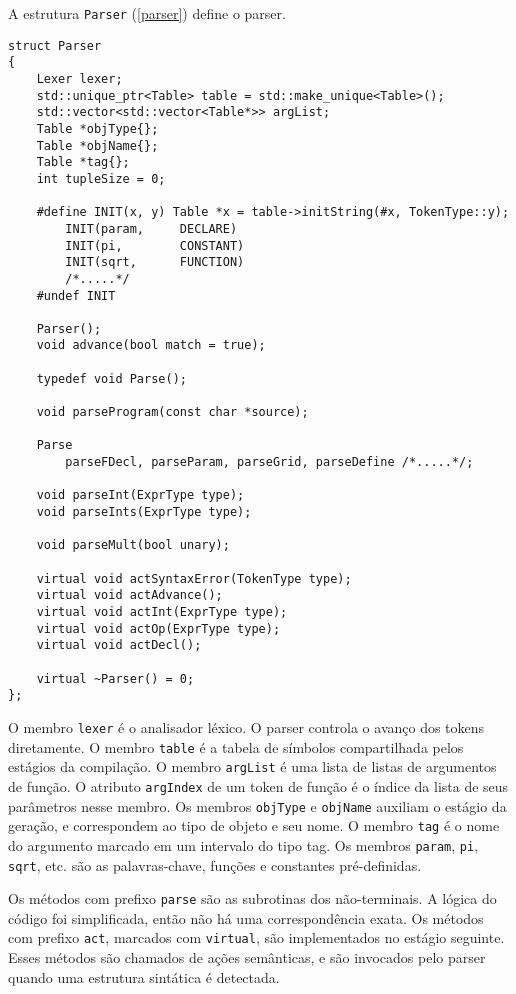 A estrutura \texttt{Parser} (\ref{parser}) define o parser.

\begin{lstlisting}[caption=Estrutura parcial do parser, label=parser]
struct Parser
{
    Lexer lexer;
    std::unique_ptr<Table> table = std::make_unique<Table>();
    std::vector<std::vector<Table*>> argList;
    Table *objType{};
    Table *objName{};
    Table *tag{};
    int tupleSize = 0;

    #define INIT(x, y) Table *x = table->initString(#x, TokenType::y);
        INIT(param,     DECLARE)
        INIT(pi,        CONSTANT)
        INIT(sqrt,      FUNCTION)
        /*.....*/
    #undef INIT

    Parser();
    void advance(bool match = true);

    typedef void Parse();

    void parseProgram(const char *source);

    Parse 
        parseFDecl, parseParam, parseGrid, parseDefine /*.....*/;

    void parseInt(ExprType type);
    void parseInts(ExprType type);

    void parseMult(bool unary);

    virtual void actSyntaxError(TokenType type);
    virtual void actAdvance();
    virtual void actInt(ExprType type);
    virtual void actOp(ExprType type);
    virtual void actDecl();

    virtual ~Parser() = 0;
};
\end{lstlisting}

O membro \texttt{lexer} é o analisador léxico. O parser controla o avanço dos tokens diretamente.
O membro \texttt{table} é a tabela de símbolos compartilhada pelos estágios da compilação.
O membro \texttt{argList} é uma lista de listas de argumentos de função.
O atributo \texttt{argIndex} de um token de função é o índice da lista
de seus parâmetros nesse membro.
Os membros \texttt{objType} e \texttt{objName} auxiliam o estágio da geração,
e correspondem ao tipo de objeto e seu nome.
O membro \texttt{tag} é o nome do argumento marcado em um intervalo do tipo tag.
Os membros \texttt{param}, \texttt{pi}, \texttt{sqrt}, etc. são
as palavras-chave, funções e constantes pré-definidas.

Os métodos com prefixo \texttt{parse} são as subrotinas dos não-terminais.
A lógica do código foi simplificada, então não há uma correspondência exata.
Os métodos com prefixo \texttt{act}, marcados com \texttt{virtual},
são implementados no estágio seguinte.
Esses métodos são chamados de ações semânticas,
e são invocados pelo parser quando uma estrutura sintática é detectada.

